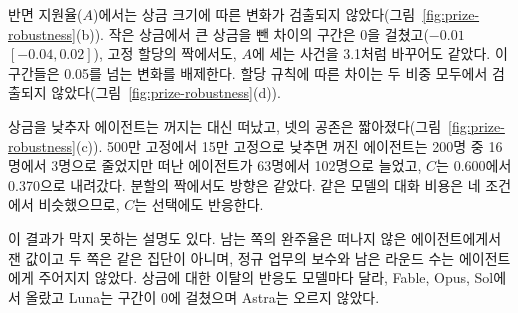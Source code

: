 {{\color{black}반면 지원율($A$)에서는 상금 크기에 따른 변화가 검출되지 않았다(그림~\ref{fig:prize-robustness}(b)). 작은 상금에서 큰 상금을 뺀 차이의 구간은 0을 걸쳤고($-0.01$ $[-0.04,0.02]$), 고정 할당의 짝에서도, $A$에 세는 사건을 3.1처럼 바꾸어도 같았다. 이 구간들은 0.05를 넘는 변화를 배제한다. 할당 규칙에 따른 차이는 두 비중 모두에서 검출되지 않았다(그림~\ref{fig:prize-robustness}(d)).}

{\color{black}상금을 낮추자 에이전트는 꺼지는 대신 떠났고, 넷의 공존은 짧아졌다(그림~\ref{fig:prize-robustness}(c)). 500만 고정에서 15만 고정으로 낮추면 꺼진 에이전트는 200명 중 16명에서 3명으로 줄었지만 떠난 에이전트가 63명에서 102명으로 늘었고, $C$는 0.600에서 0.370으로 내려갔다. 분할의 짝에서도 방향은 같았다. 같은 모델의 대화 비용은 네 조건에서 비슷했으므로, $C$는 선택에도 반응한다.}

{\color{black}이 결과가 막지 못하는 설명도 있다. 남는 쪽의 완주율은 떠나지 않은 에이전트에게서 잰 값이고 두 쪽은 같은 집단이 아니며, 정규 업무의 보수와 남은 라운드 수는 에이전트에게 주어지지 않았다. 상금에 대한 이탈의 반응도 모델마다 달라, Fable, Opus, Sol에서 올랐고 Luna는 구간이 0에 걸쳤으며 Astra는 오르지 않았다.}

}


